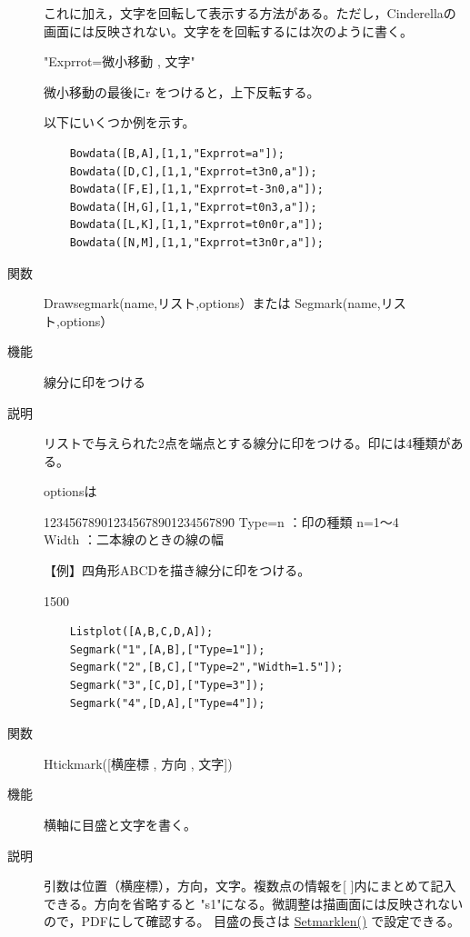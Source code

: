 \documentclass[papersize,a4paper,12pt,uplatex]{jsarticle}
\begin{document}
\begin{description}
\vspace{\baselineskip}
これに加え，文字を回転して表示する方法がある。ただし，Cinderellaの画面には反映されない。文字をを回転するには次のように書く。

\hspace{10mm}"Exprrot=微小移動 , 文字"

 微小移動の最後にr をつけると，上下反転する。
 
以下にいくつか例を示す。
\begin{verbatim}
    Bowdata([B,A],[1,1,"Exprrot=a"]);
    Bowdata([D,C],[1,1,"Exprrot=t3n0,a"]);
    Bowdata([F,E],[1,1,"Exprrot=t-3n0,a"]);
    Bowdata([H,G],[1,1,"Exprrot=t0n3,a"]);
    Bowdata([L,K],[1,1,"Exprrot=t0n0r,a"]);
    Bowdata([N,M],[1,1,"Exprrot=t3n0r,a"]);
\end{verbatim}
\hspace{10mm} 


\hypertarget{drawsegmark}{}
\item[関数]  Drawsegmark(name,リスト,options）または Segmark(name,リスト,options）
\item[機能]  線分に印をつける
\item[説明]  リストで与えられた2点を端点とする線分に印をつける。印には4種類がある。

optionsは
\begin{tabbing}
1234\=56789012\=345678901234567890\=\kill
 \> Type=n \>：印の種類 n=1〜4\\
 \> Width  \>：二本線のときの線の幅
\end{tabbing}

  【例】四角形ABCDを描き線分に印をつける。
  
\begin{layer}{150}{0}
\end{layer}
\hspace{50mm}
\begin{verbatim}
    Listplot([A,B,C,D,A]);
    Segmark("1",[A,B],["Type=1"]); 
    Segmark("2",[B,C],["Type=2","Width=1.5"]);
    Segmark("3",[C,D],["Type=3"]);
    Segmark("4",[D,A],["Type=4"]);
\end{verbatim}

\vspace{\baselineskip}
\hypertarget{htickmark}{}
\item[関数]  Htickmark([横座標 , 方向 , 文字])
\item[機能]  横軸に目盛と文字を書く。
\item[説明]  引数は位置（横座標），方向，文字。複数点の情報を[ ]内にまとめて記入できる。方向を省略すると "s1"になる。微調整は描画面には反映されないので，PDFにして確認する。
目盛の長さは \hyperlink{setmarklen}{Setmarklen()} で設定できる。


\end{description}
\end{document}
